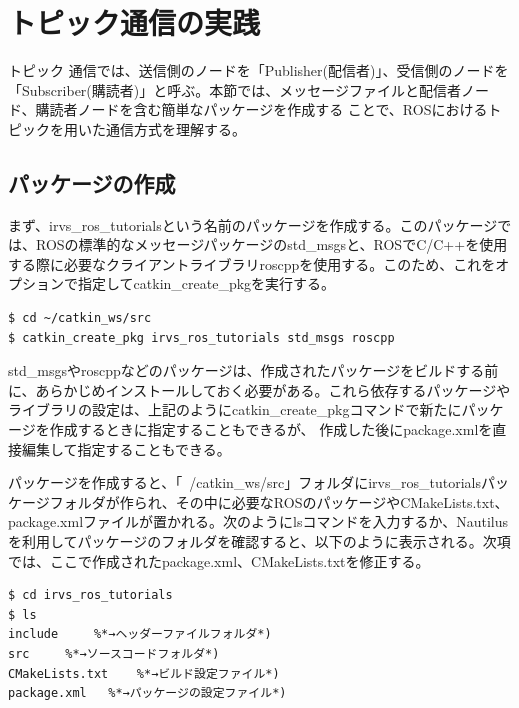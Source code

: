 \section{トピック通信の実践}

トピック  通信では、送信側のノードを「Publisher(配信者)」、受信側のノードを「Subscriber(購読者)」と呼ぶ。本節では、メッセージファイルと配信者ノード、購読者ノードを含む簡単なパッケージを作成する  ことで、ROSにおけるトピックを用いた通信方式を理解する。

\subsection{パッケージの作成}

まず、irvs\_ros\_tutorialsという名前のパッケージを作成する。このパッケージでは、ROSの標準的なメッセージパッケージのstd\_msgsと、ROSでC/C++を使用する際に必要なクライアントライブラリroscppを使用する。このため、これをオプションで指定してcatkin\_create\_pkgを実行する。

\begin{lstlisting}[language=ROS]
$ cd ~/catkin_ws/src
$ catkin_create_pkg irvs_ros_tutorials std_msgs roscpp
\end{lstlisting}

std\_msgsやroscppなどのパッケージは、作成されたパッケージをビルドする前に、あらかじめインストールしておく必要がある。これら依存するパッケージやライブラリの設定は、上記のようにcatkin\_create\_pkgコマンドで新たにパッケージを作成するときに指定することもできるが、  作成した後にpackage.xmlを直接編集して指定することもできる。

パッケージを作成すると、「~/catkin\_ws/src」フォルダにirvs\_ros\_tutorialsパッケージフォルダが作られ、その中に必要なROSのパッケージやCMakeLists.txt、 package.xmlファイルが置かれる。次のようにlsコマンドを入力するか、Nautilusを利用してパッケージのフォルダを確認すると、以下のように表示される。次項では、ここで作成されたpackage.xml、CMakeLists.txtを修正する。

\begin{lstlisting}[language=ROS]
$ cd irvs_ros_tutorials
$ ls
include     %*→ヘッダーファイルフォルダ*)
src     %*→ソースコードフォルダ*)
CMakeLists.txt    %*→ビルド設定ファイル*)
package.xml   %*→パッケージの設定ファイル*)
\end{lstlisting}

